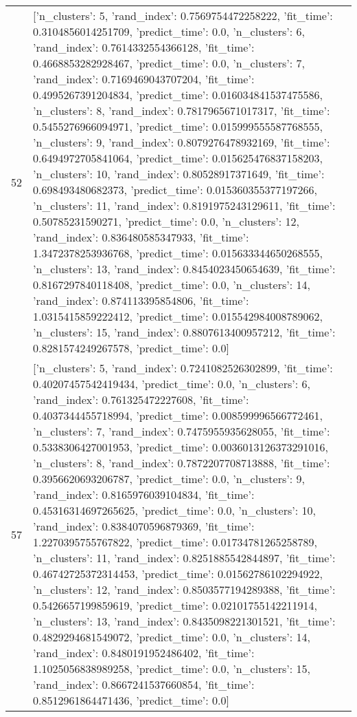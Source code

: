 \begin{tabular}{rl}
52 & [{'n_clusters': 5, 'rand_index': 0.7569754472258222, 'fit_time': 0.3104856014251709, 'predict_time': 0.0}, {'n_clusters': 6, 'rand_index': 0.7614332554366128, 'fit_time': 0.4668853282928467, 'predict_time': 0.0}, {'n_clusters': 7, 'rand_index': 0.7169469043707204, 'fit_time': 0.4995267391204834, 'predict_time': 0.016034841537475586}, {'n_clusters': 8, 'rand_index': 0.7817965671017317, 'fit_time': 0.5455276966094971, 'predict_time': 0.015999555587768555}, {'n_clusters': 9, 'rand_index': 0.8079276478932169, 'fit_time': 0.6494972705841064, 'predict_time': 0.015625476837158203}, {'n_clusters': 10, 'rand_index': 0.80528917371649, 'fit_time': 0.698493480682373, 'predict_time': 0.015360355377197266}, {'n_clusters': 11, 'rand_index': 0.8191975243129611, 'fit_time': 0.50785231590271, 'predict_time': 0.0}, {'n_clusters': 12, 'rand_index': 0.836480585347933, 'fit_time': 1.3472378253936768, 'predict_time': 0.015633344650268555}, {'n_clusters': 13, 'rand_index': 0.8454023450654639, 'fit_time': 0.8167297840118408, 'predict_time': 0.0}, {'n_clusters': 14, 'rand_index': 0.874113395854806, 'fit_time': 1.0315415859222412, 'predict_time': 0.015542984008789062}, {'n_clusters': 15, 'rand_index': 0.8807613400957212, 'fit_time': 0.8281574249267578, 'predict_time': 0.0}] \\
57 & [{'n_clusters': 5, 'rand_index': 0.7241082526302899, 'fit_time': 0.40207457542419434, 'predict_time': 0.0}, {'n_clusters': 6, 'rand_index': 0.761325472227608, 'fit_time': 0.4037344455718994, 'predict_time': 0.008599996566772461}, {'n_clusters': 7, 'rand_index': 0.7475955935628055, 'fit_time': 0.5338306427001953, 'predict_time': 0.0036013126373291016}, {'n_clusters': 8, 'rand_index': 0.7872207708713888, 'fit_time': 0.3956620693206787, 'predict_time': 0.0}, {'n_clusters': 9, 'rand_index': 0.8165976039104834, 'fit_time': 0.45316314697265625, 'predict_time': 0.0}, {'n_clusters': 10, 'rand_index': 0.8384070596879369, 'fit_time': 1.2270395755767822, 'predict_time': 0.01734781265258789}, {'n_clusters': 11, 'rand_index': 0.8251885542844897, 'fit_time': 0.46742725372314453, 'predict_time': 0.01562786102294922}, {'n_clusters': 12, 'rand_index': 0.8503577194289388, 'fit_time': 0.5426657199859619, 'predict_time': 0.02101755142211914}, {'n_clusters': 13, 'rand_index': 0.8435098221301521, 'fit_time': 0.4829294681549072, 'predict_time': 0.0}, {'n_clusters': 14, 'rand_index': 0.8480191952486402, 'fit_time': 1.1025056838989258, 'predict_time': 0.0}, {'n_clusters': 15, 'rand_index': 0.8667241537660854, 'fit_time': 0.8512961864471436, 'predict_time': 0.0}] \\

\end{tabular}
